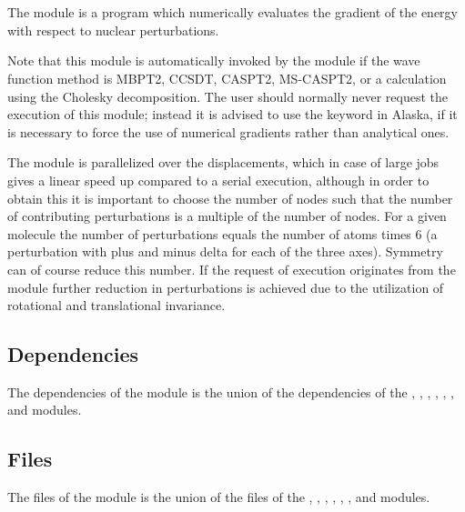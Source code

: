 
\section{}
\label{UG:sec:numerical_gradient}

The  module is a program which numerically evaluates the gradient
of the energy with respect to nuclear perturbations.

Note that this module is automatically invoked by the  module if the wave function
method is MBPT2, CCSDT, CASPT2, MS-CASPT2, or a calculation using the Cholesky decomposition.
The user should normally never request the execution of this module; instead it is advised to use the
 keyword in Alaska, if it is necessary to force the use of numerical gradients rather than
analytical ones.

The module is parallelized over the displacements, which in case of large jobs gives a linear
speed up compared to a serial execution, although in order to obtain this it is important to
choose the number of nodes such that the number of contributing perturbations is a multiple of
the number of nodes. For a given molecule the number of perturbations equals the number of atoms
times 6 (a perturbation with plus and minus delta for each of the three axes). Symmetry can of
course reduce this number. If the request of execution originates from the  
module further reduction in perturbations is achieved due to the utilization of rotational and
translational invariance.

\subsection{Dependencies}
\label{UG:sec:Numerical_gradient_dependencies}
The dependencies of the  module is the union
of the dependencies of the , , ,
, , , and
 modules.

\subsection{Files}
\label{UG:sec:Numerical_gradient_files}
The files of the  module is the union
of the files of the , , ,
, , , and
 modules.

